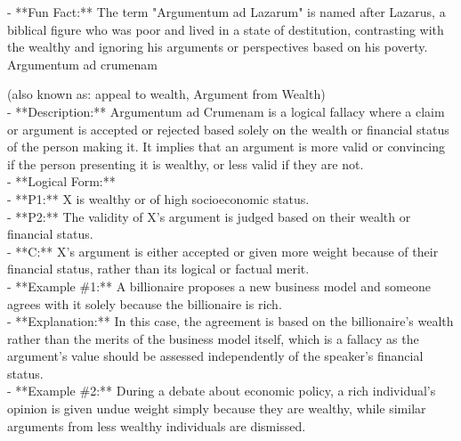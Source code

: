 \documentclass[a4paper,12pt,single,pdftex]{scrartcl}
\begin{document}
    
      - **Fun Fact:** The term "Argumentum ad Lazarum" is named after Lazarus, a biblical figure who was poor and lived in a state of destitution, contrasting with the wealthy and ignoring his arguments or perspectives based on his poverty.
    \\

  

Argumentum ad crumenam
    
      (also known as: appeal to wealth, Argument from Wealth)
    \\

  
    
      - **Description:** Argumentum ad Crumenam is a logical fallacy where a claim or argument is accepted or rejected based solely on the wealth or financial status of the person making it. It implies that an argument is more valid or convincing if the person presenting it is wealthy, or less valid if they are not.
    \\

    
      - **Logical Form:**
    \\

    
        - **P1:** X is wealthy or of high socioeconomic status.
    \\

    
        - **P2:** The validity of X's argument is judged based on their wealth or financial status.
    \\

    
        - **C:** X’s argument is either accepted or given more weight because of their financial status, rather than its logical or factual merit.
    \\

    
      - **Example \#1:** A billionaire proposes a new business model and someone agrees with it solely because the billionaire is rich.
    \\

    
      - **Explanation:** In this case, the agreement is based on the billionaire’s wealth rather than the merits of the business model itself, which is a fallacy as the argument’s value should be assessed independently of the speaker’s financial status.
    \\

    
      - **Example \#2:** During a debate about economic policy, a rich individual’s opinion is given undue weight simply because they are wealthy, while similar arguments from less wealthy individuals are dismissed.
    \\
\end{document}
